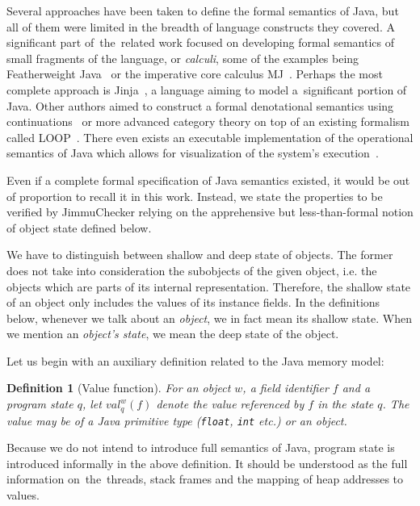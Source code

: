 \documentclass{pracamgr}
\theoremstyle{break}
\newtheorem{defi}{Definition}
\theoremstyle{break}
\theoremstyle{break}
\begin{document}
Several approaches have been taken to define the formal semantics of
Java, but all of them were limited in the breadth of language
constructs they covered. A significant part of~the~related work
focused on developing formal semantics of small fragments of the
language, or \emph{calculi}, some of the examples being Featherweight
Java~\cite{javasem:feather} or the imperative core calculus
MJ~\cite{javasem:mj}. Perhaps the most complete approach is
Jinja~\cite{javasem:jinja}, a language aiming to model a~significant
portion of Java. Other authors aimed to construct a formal
denotational semantics using continuations~\cite{sem:cont} or more
advanced category theory on top of an existing formalism called
LOOP~\cite{sem:cat}. There even exists an executable implementation of
the operational semantics of Java which allows for visualization of
the system's execution~\cite{javasem:exec}.

Even if a complete formal specification of Java semantics existed, it
would be out of proportion to recall it in this work. Instead, we
state the properties to be verified by JimmuChecker relying on the
apprehensive but less-than-formal notion of object state defined below.

We have to distinguish between shallow and deep state of objects. The
former does not take into consideration the subobjects of the given
object, i.e. the objects which are parts of its internal
representation. Therefore, the shallow state of an object only
includes the values of its instance fields. In the definitions below,
whenever we talk about an \emph{object}, we in fact mean its shallow
state. When we mention an \emph{object's state}, we mean the deep
state of the object.

Let us begin with an auxiliary definition related to the Java memory
model:
\begin{defi}[Value function]
  For an object $w$, a field identifier $f$ and a program state $q$,
  let $val_q^w(f)$ denote the value referenced by $f$ in the state
  $q$. The value may be of a Java primitive type (\texttt{float},
  \texttt{int} etc.) or an object.
\end{defi}
Because we do not intend to introduce full semantics of Java, program
state is introduced informally in the above definition. It should
be understood as the full information on~the~threads, stack frames and
the mapping of heap addresses to values. 
\end{document}
